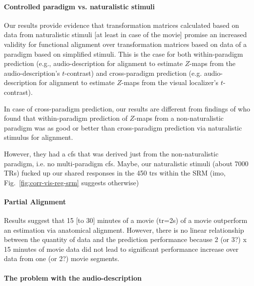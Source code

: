 

\paragraph{Controlled paradigm vs. naturalistic stimuli}
%
Our results provide evidence that transformation matrices calculated based on
data from naturalistic stimuli [at least in case of the movie] promise an
increased validity for functional alignment over transformation matrices based
on data of a paradigm based on simplified stimuli.
%
This is the case for both within-paradigm prediction (e.g., audio-description
for alignment to estimate $Z$-maps from the audio-description's $t$-contrast)
and cross-paradigm prediction (e.g. audio-description for alignment to estimate
$Z$-maps from the visual localizer's $t$-contrast).

%
In case of cross-paradigm prediction, our results are different from findings of
\citet{haxby2011common} who found that within-paradigm prediction of $Z$-maps
from a non-naturalistic paradigm was as good or better than cross-paradigm
prediction via naturalistic stimulus for alignment.

%
However, they had a \ac{cfs} that was derived just from the non-naturalistic
paradigm, i.e. no multi-paradigm \ac{cfs}.
%
Maybe, our naturalistic stimuli (about 7000 TRs) fucked up our shared responses
in the 450 \acp{tr} within the SRM (imo, Fig.~\ref{fig:corr-vis-reg-srm}
suggests otherwise)


\paragraph{Partial Alignment}


%
Results suggest that 15 [to 30] minutes of a movie (\ac{tr}=2s) of a movie
outperform an estimation via anatomical alignment.
%
However, there is no linear relationship between the quantity of data and the
prediction performance because 2 (or 3?) x 15 minutes of movie data did not lead
to significant performance increase over data from one (or 2?) movie segments.


\paragraph{The problem with the audio-description}

